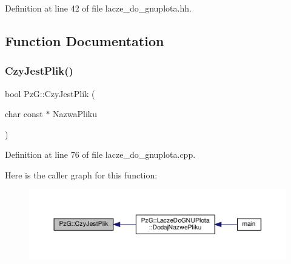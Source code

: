 Definition at line 42 of file lacze\+\_\+do\+\_\+gnuplota.\+hh.



\subsection{Function Documentation}
\mbox{\label{namespace_pz_g_ae1ae4d36f66c77879380ba73da8e20e3}} 
\subsubsection{\texorpdfstring{Czy\+Jest\+Plik()}{CzyJestPlik()}}
{\footnotesize\ttfamily bool Pz\+G\+::\+Czy\+Jest\+Plik (\begin{DoxyParamCaption}\item[{char const $\ast$}]{Nazwa\+Pliku }\end{DoxyParamCaption})}



Definition at line 76 of file lacze\+\_\+do\+\_\+gnuplota.\+cpp.

Here is the caller graph for this function\+:\nopagebreak
\begin{figure}[H]
\begin{center}
\leavevmode
\includegraphics[width=350pt]{namespace_pz_g_ae1ae4d36f66c77879380ba73da8e20e3_icgraph}
\end{center}
\end{figure}
